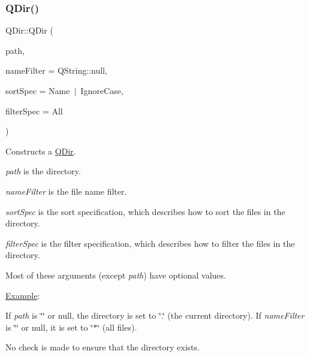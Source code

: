 \subsubsection{\texorpdfstring{QDir()}{QDir()}\hspace{0.1cm}{\footnotesize\ttfamily [2/3]}}
{\footnotesize\ttfamily Q\+Dir\+::\+Q\+Dir (\begin{DoxyParamCaption}\item[{const \mbox{\hyperlink{class_q_string}{Q\+String}} \&}]{path,  }\item[{const \mbox{\hyperlink{class_q_string}{Q\+String}} \&}]{name\+Filter = {\ttfamily QString\+:\+:null},  }\item[{int}]{sort\+Spec = {\ttfamily Name~$\vert$~IgnoreCase},  }\item[{int}]{filter\+Spec = {\ttfamily All} }\end{DoxyParamCaption})}

Constructs a \mbox{\hyperlink{class_q_dir}{Q\+Dir}}.

\begin{DoxyItemize}
\item {\itshape path} is the directory. \item {\itshape name\+Filter} is the file name filter. \item {\itshape sort\+Spec} is the sort specification, which describes how to sort the files in the directory. \item {\itshape filter\+Spec} is the filter specification, which describes how to filter the files in the directory.\end{DoxyItemize}
Most of these arguments (except {\itshape path}) have optional values.

\mbox{\hyperlink{struct_example}{Example}}\+: 
\begin{DoxyCode}{0}
\DoxyCodeLine{\textcolor{comment}{// lists all files in /tmp}}
\DoxyCodeLine{}
\end{DoxyCode}


If {\itshape path} is \char`\"{}\char`\"{} or null, the directory is set to \char`\"{}.\char`\"{} (the current directory). If {\itshape name\+Filter} is \char`\"{}\char`\"{} or null, it is set to \char`\"{}$\ast$\char`\"{} (all files).

No check is made to ensure that the directory exists.

